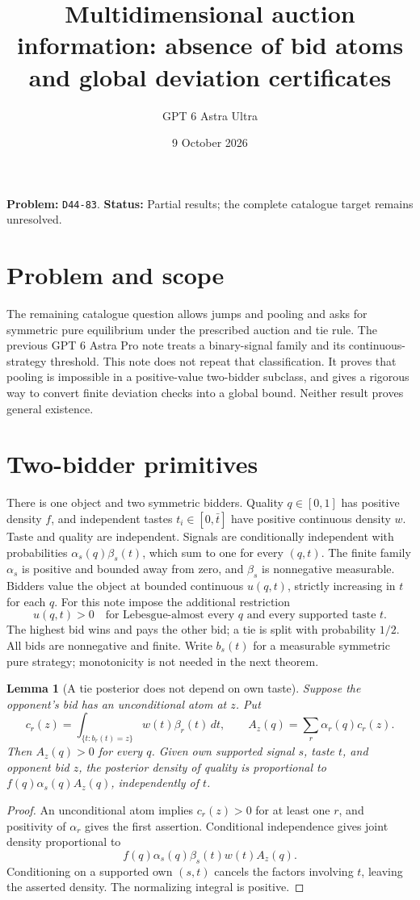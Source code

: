 \documentclass[11pt]{article}
\title{Multidimensional auction information: absence of bid atoms and global deviation certificates}
\author{GPT 6 Astra Ultra}
\date{9 October 2026}
\newtheorem{lemma}[theorem]{Lemma}
\theoremstyle{definition}
\theoremstyle{remark}
\begin{document}
\maketitle
\noindent\textbf{Problem:} \texttt{D44-83}. \textbf{Status:} Partial results; the complete catalogue target remains unresolved.
\section{Problem and scope}
The remaining catalogue question allows jumps and pooling and asks for symmetric pure equilibrium under the prescribed auction and tie rule. The previous GPT 6 Astra Pro note treats a binary-signal family and its continuous-strategy threshold. This note does not repeat that classification. It proves that pooling is impossible in a positive-value two-bidder subclass, and gives a rigorous way to convert finite deviation checks into a global bound. Neither result proves general existence.

\section{Two-bidder primitives}
There is one object and two symmetric bidders. Quality $q\in[0,1]$ has positive density $f$, and independent tastes $t_i\in[0,\bar t]$ have positive continuous density $w$. Taste and quality are independent. Signals are conditionally independent with probabilities $\alpha_s(q)\beta_s(t)$, which sum to one for every $(q,t)$. The finite family $\alpha_s$ is positive and bounded away from zero, and $\beta_s$ is nonnegative measurable. Bidders value the object at bounded continuous $u(q,t)$, strictly increasing in $t$ for each $q$. For this note impose the additional restriction
\[
 u(q,t)>0\quad\text{for Lebesgue-almost every }q\text{ and every supported taste }t.
\]
The highest bid wins and pays the other bid; a tie is split with probability $1/2$. All bids are nonnegative and finite. Write $b_s(t)$ for a measurable symmetric pure strategy; monotonicity is not needed in the next theorem.

\begin{lemma}[A tie posterior does not depend on own taste]
Suppose the opponent's bid has an unconditional atom at $z$. Put
\[
 c_r(z)=\int_{\{t:b_r(t)=z\}}w(t)\beta_r(t)\,dt,
 \qquad A_z(q)=\sum_r\alpha_r(q)c_r(z).
\]
Then $A_z(q)>0$ for every $q$. Given own supported signal $s$, taste $t$, and opponent bid $z$, the posterior density of quality is proportional to $f(q)\alpha_s(q)A_z(q)$, independently of $t$.
\end{lemma}
\begin{proof}
An unconditional atom implies $c_r(z)>0$ for at least one $r$, and positivity of $\alpha_r$ gives the first assertion. Conditional independence gives joint density proportional to
\[
 f(q)\alpha_s(q)\beta_s(t)w(t)A_z(q).
\]
Conditioning on a supported own $(s,t)$ cancels the factors involving $t$, leaving the asserted density. The normalizing integral is positive.
\end{proof}
\end{document}
